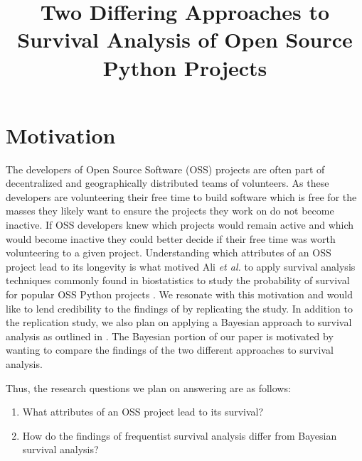 \documentclass[conference]{IEEEtran}
\begin{document}


\title{Two Differing Approaches to Survival Analysis of Open Source Python Projects}

\author{
}

\maketitle

\section{Motivation}

The developers of Open Source Software (OSS) projects are often part of decentralized and geographically distributed teams of volunteers. As these developers are volunteering their free time to build software which is free for the masses they likely want to ensure the projects they work on do not become inactive. If OSS developers knew which projects would remain active and which would become inactive they could better decide if their free time was worth volunteering to a given project. Understanding which attributes of an OSS project lead to its longevity is what motived Ali \emph{et al.} to apply survival analysis techniques commonly found in biostatistics to study the probability of survival for popular OSS Python projects \cite{ali2020cheating}. We resonate with this motivation and would like to lend credibility to the findings of \cite{ali2020cheating} by replicating the study. In addition to the replication study, we also plan on applying a Bayesian approach to survival analysis as outlined in \cite{kelter2020bayesian}. The Bayesian portion of our paper is motivated by wanting to compare the findings of the two different approaches to survival analysis.

Thus, the research questions we plan on answering are as follows:

\begin{enumerate}
    \item What attributes of an OSS project lead to its survival?
    \item How do the findings of frequentist survival analysis differ from Bayesian survival analysis?
\end{enumerate}
\end{document}
